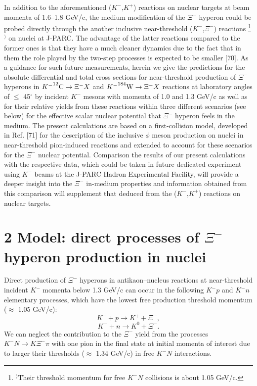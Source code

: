 \documentclass[12pt]{article}
\begin{document}
In addition to the aforementioned ($K^-$,$K^+$) reactions on nuclear targets at beam momenta
of 1.6--1.8 GeV/c, the medium modification of the $\Xi^-$ hyperon could be probed directly through the
another inclusive near-threshold ($K^-$,$\Xi^-$) reactions
\footnote{$^)$Their threshold momentum for free $K^-N$ collisions is about 1.05 GeV/c.}$^)$
on nuclei at J-PARC. The advantage of the latter reactions compared to the former ones is that
they have a much cleaner dynamics due to the fact that in them the role played by the
two-step processes is expected to be smaller [70].
As a guidance for such future measurements, herein we give the predictions
for the absolute differential and total cross sections for near-threshold production of $\Xi^-$ hyperons in
${K^-}^{12}{\rm C} \to {\Xi^-}X$ and ${K^-}^{184}{\rm W} \to {\Xi^-}X$ reactions at laboratory angles of
$\le$ 45$^{\circ}$ by incident $K^-$ mesons with momenta of 1.0 and 1.3 GeV/c as well as for their relative yields
from these reactions within three different scenarios (see below) for the effective scalar nuclear potential that
$\Xi^-$ hyperon feels in the medium.
The present calculations are based on a first-collision model, developed in Ref. [71] for the
description of the inclusive $\phi$ meson production on nuclei in near-threshold pion-induced reactions
and extended to account for these scenarios for the $\Xi^-$ nuclear potential.
Comparison the results of our present calculations with the respective data, which could be
taken in future dedicated experiment using $K^-$ beams at the J-PARC Hadron Experimental Facility,
will provide a deeper insight into the $\Xi^-$ in-medium properties and information obtained from this
comparison will supplement that deduced from the ($K^-$,$K^+$) reactions on nuclear targets.

\section*{2 Model: direct processes of $\Xi^-$ hyperon production in nuclei}

\hspace{0.5cm} Direct production of $\Xi^-$ hyperons in antikaon--nucleus
reactions at near-threshold incident $K^-$ momenta below 1.3 GeV/c can occur
in the following $K^-p$ and $K^-n$ elementary processes, which have
the lowest free production threshold momentum ($\approx$ 1.05 GeV/c):
\begin{equation}
K^-+p \to K^++\Xi^-,
\end{equation}
\begin{equation}
K^-+n \to K^0+\Xi^-.
\end{equation}
We can neglect the contribution to the $\Xi^-$ yield from the processes $K^-N \to K{\Xi^-}{\pi}$
with one pion in the final state at initial momenta of interest due to larger their thresholds
($\approx$ 1.34 GeV/c) in free $K^-N$ interactions.
\end{document}
